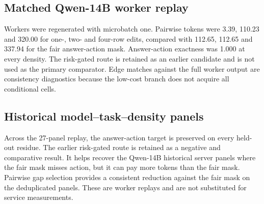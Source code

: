 \documentclass[11pt]{article}
\begin{document}
\subsection{Matched Qwen-14B worker replay}
Workers were regenerated with microbatch one. Pairwise tokens were 3.39, 110.23 and 320.00 for one-, two- and four-row edits, compared with 112.65, 112.65 and 337.94 for the fair answer-action mask. Answer-action exactness was 1.000 at every density. The risk-gated route is retained as an earlier candidate and is not used as the primary comparator. Edge matches against the full worker output are consistency diagnostics because the low-cost branch does not acquire all conditional cells.

\begin{table}[t]
\centering\small
{}
\caption{Matched Qwen-14B worker replay. Fair action cost refreshes descendant relay rows and stops at the answer target. TCR includes the full edge-audit target.}
\end{table}

\subsection{Historical model--task--density panels}
Across the 27-panel replay, the answer-action target is preserved on every held-out residue. The earlier risk-gated route is retained as a negative and comparative result. It helps recover the Qwen-14B historical server panels where the fair mask misses action, but it can pay more tokens than the fair mask. Pairwise gap selection provides a consistent reduction against the fair mask on the deduplicated panels. These are worker replays and are not substituted for service measurements.
\end{document}
